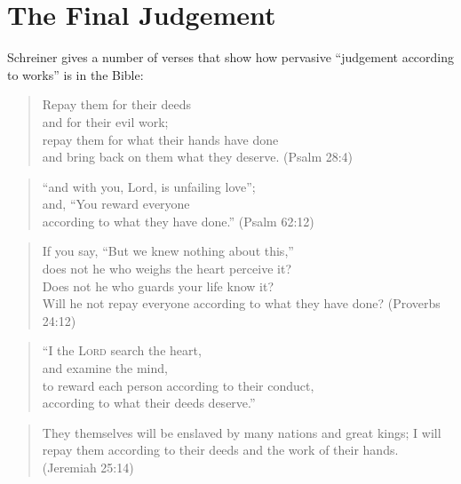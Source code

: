 \section{The Final Judgement}

Schreiner gives a number of verses that show how pervasive \enquote{judgement
according to works} is in the Bible:

\VerseQuoteStyle
\begin{quote}
    Repay them for their deeds\\
    \VerseIndent and for their evil work;\\
    repay them for what their hands have done\\
    \VerseIndent and bring back on them what they deserve. (Psalm 28:4)\\
\end{quote}

\begin{quote}
    \VerseIndent \enquote{and with you, Lord, is unfailing love};\\
    and, \enquote{You reward everyone\\
    \VerseIndent according to what they have done.} (Psalm 62:12)\\
\end{quote}

\begin{quote}
    If you say, \enquote{But we knew nothing about this,}\\
    \VerseIndent does not he who weighs the heart perceive it?\\
    Does not he who guards your life know it?\\
    \VerseIndent Will he not repay everyone according to what they have done?
    (Proverbs 24:12)\\
\end{quote}

\begin{quote}
    \enquote{I the \textsc{Lord} search the heart,\\
    \VerseIndent and examine the mind,\\
    to reward each person according to their conduct,\\
    \VerseIndent according to what their deeds deserve.}\\
\end{quote}
\NormalQuoteStyle

\begin{quote}
    They themselves will be enslaved by many nations and great kings; I will
    repay them according to their deeds and the work of their hands. (Jeremiah
    25:14)
\end{quote}

